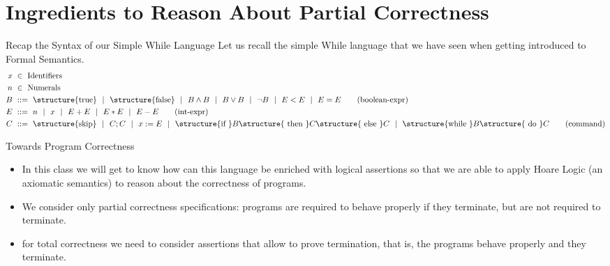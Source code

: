 \documentclass[aspectratio=169]{beamer}
\begin{document}
\frame[plain]{\titlepage}


\section{Ingredients to Reason About Partial Correctness}

\newcommand{\kw}[1]{\structure{\text{#1}}}

\begin{slide}{Recap the Syntax of our Simple While Language}
  Let us recall the simple While language that we have seen when getting introduced to Formal Semantics.
  \begin{align*}
  x &~\in~ \text{Identifiers}
  \\
  n &~\in~ \text{Numerals}
  \\
  B &~::=~ \kw{true} ~~|~~ \kw{false}  ~~|~~ B \land B ~~|~~ B \lor B ~~|~~ \lnot B ~~|~~ E<E ~~|~~ E=E
  \tag{boolean-expr}\\
  E &~::=~ n ~~|~~ x ~~|~~ E+E ~~|~~ E*E ~~|~~ E-E
  \tag{int-expr}\\
  C &~::=~ \kw {skip} ~~|~~ C;C ~~|~~ x:=E
 ~~|~~  \kw{if } B \kw{ then } C\kw{ else }C ~~|~~  \kw{while }B\kw{ do }C
  \tag{command}
\end{align*}
\end{slide}

\begin{slide}{Towards Program Correctness}

\begin{itemize}
\item In this class we will get to know how can this language be enriched with logical assertions so that we are able to apply Hoare Logic (an axiomatic semantics) to reason about the correctness of programs.  
\item We consider only \alert{partial correctness} specifications: programs are required to behave properly if they terminate, but are not required to terminate.
\item for \alert{total correctness} we need to consider assertions that allow to prove \alert{termination}, that is, the programs behave properly and they terminate.
\end{itemize}
\end{slide}
\end{document}
